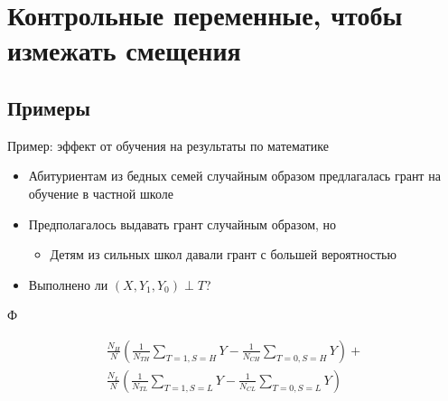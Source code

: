 
\section{Контрольные переменные, чтобы измежать смещения}


\subsection{Примеры}

\begin{frame}{Пример: эффект от обучения на результаты по математике \parencite{barnard2003principal}}
    \begin{itemize}
        \item Абитуриентам из бедных семей случайным образом предлагалась грант на обучение в частной школе
        \item Предполагалось выдавать грант случайным образом, но
        \begin{itemize}
            \item Детям из сильных школ давали грант с большей вероятностью
        \end{itemize}
        \item Выполнено ли $(X, Y_1, Y_0) \perp T$?
   \end{itemize}
\end{frame}


\begin{frame}{Ф}

\begin{gather*}
\frac{N_H}{N} \left(\frac{1}{N_{TH}}\sum_{T=1, S=H} Y - \frac{1}{N_{CH}}\sum_{T=0,S=H} Y \right)+ \\
\frac{N_L}{N} \left(\frac{1}{N_{TL}}\sum_{T=1, S=L} Y - \frac{1}{N_{CL}}\sum_{T=0,S=L} Y \right)
\end{gather*}

\end{frame}


